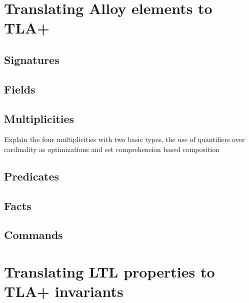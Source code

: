 \section{Translating Alloy elements to TLA+}

\subsection{Signatures}


\subsection{Fields}

\subsection{Multiplicities}

Explain the four multiplicities with two basic types, the use of quantifiers over cardinality as optimizations and set comprehension based composition

\subsection{Predicates}

\subsection{Facts}

\subsection{Commands}


\section{Translating LTL properties to TLA+ invariants}
